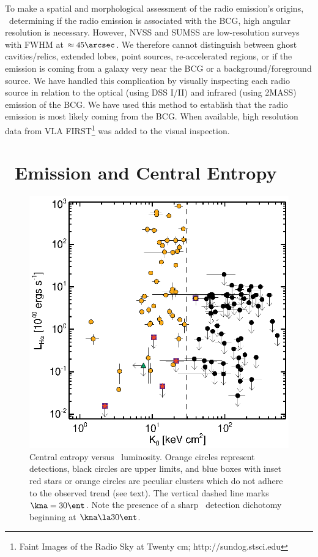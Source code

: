 \documentclass{emulateapj}
\begin{document}
To make a spatial and morphological assessment of the radio emission's
origins, \ie\ determining if the radio emission is associated with the
BCG, high angular resolution is necessary. However, NVSS and SUMSS are
low-resolution surveys with FWHM at $\approx 45\arcsec$. We therefore
cannot distinguish between ghost cavities/relics, extended lobes,
point sources, re-accelerated regions, or if the emission is coming
from a galaxy very near the BCG or a background/foreground source. We
have handled this complication by visually inspecting each radio
source in relation to the optical (using DSS I/II) and infrared (using
2MASS) emission of the BCG. We have used this method to establish that
the radio emission is most likely coming from the BCG. When available,
high resolution data from VLA FIRST\footnote{Faint Images of the Radio
 Sky at Twenty cm; http://sundog.stsci.edu} was added to the visual
inspection.

\section{\halpha\ Emission and Central Entropy}
\label{sec:sf}

\begin{figure}
 \begin{center}
    \includegraphics*[width=\columnwidth, trim=28mm 7mm 40mm 17mm, clip]{ha}
    \caption{Central entropy versus \halpha\ luminosity. Orange
      circles represent detections, black circles are upper limits,
      and blue boxes with inset red stars or orange circles are
      peculiar clusters which do not adhere to the observed trend (see
      text). The vertical dashed line marks $\kna = 30 \ent$. Note
      the presence of a sharp \halpha\ detection dichotomy beginning
      at $\kna \la 30 \ent$.}
    \label{fig:ha}
  \end{center}
\end{figure}
\end{document}
